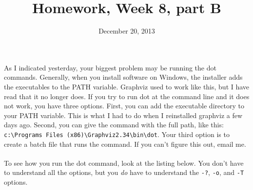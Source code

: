 \documentclass{article}
\title{Homework, Week 8, part B}
\date{December 20, 2013}
\begin{document}
\maketitle{}

\paragraph{}As I indicated yesterday, your biggest problem may be running the dot commands. Generally, when you install software on Windows, the installer adds the executables to the PATH variable. Graphviz used to work like this, but I have read that it no longer does. If you try to run dot at the command line and it does not work, you have three options. First, you can add the executable directory to your PATH variable. This is what I had to do when I reinstalled graphviz a few days ago. Second, you can give the command with the full path, like this: \texttt{c:\textbackslash{}Programs Files (x86)\textbackslash{}Graphviz2.34\textbackslash{}bin\textbackslash{}dot}. Your third option is to create a batch file that runs the command. If you can't figure this out, email me.

\paragraph{}To see how you run the dot command, look at the listing below. You don't have to understand all the options, but you \textit{do} have to understand the \texttt{-?}, \texttt{-o}, and \texttt{-T} options.
\end{document}
